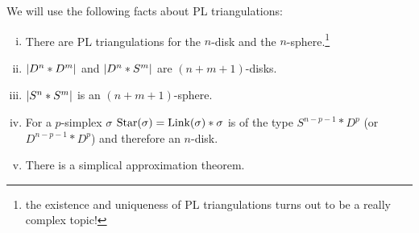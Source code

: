 We will use the following facts about PL triangulations:
\begin{enumerate}[(i),itemsep=0pt]
	\item There are PL triangulations for the $n$-disk and the $n$-sphere.\footnote{the existence and uniqueness of PL triangulations turns out to be a really complex topic!}
	\item $\abs*{D^n * D^m}$ and $\abs*{D^n * S^m}$ are $(n+m+1)$-disks.
	\item $\abs*{S^n * S^m}$ is an $(n+m+1)$-sphere.
	\item For a $p$-simplex $\sigma$ $\Star(\sigma) = \Link(\sigma) * \sigma$ is of the type $S^{n-p-1} * D^p$ (or $D^{n-p-1} * D^p$) and therefore an $n$-disk. 
	\item There is a simplical approximation theorem.
\end{enumerate}

